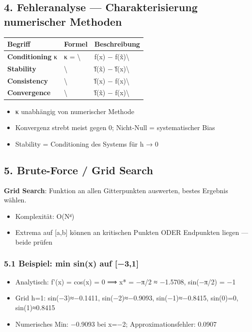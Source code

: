 \documentclass[11pt, a4paper]{article}
\begin{document}
\subsection{4. Fehleranalyse — Charakterisierung numerischer Methoden}


{\small
\begin{tabularx}{\linewidth}{XXX}
\hline
\rowcolor{tableheadbg}
{\color{white}\textbf{Begriff}} & {\color{white}\textbf{Formel}} & {\color{white}\textbf{Beschreibung}} \\[2pt]
\hline
\endhead
\hline
\endfoot
\textbf{Conditioning} κ & κ = \textbackslash{} & f(x) − f(x̃)\textbackslash{} \\
\textbf{Stability} & \textbackslash{} & f̃(x̃) − f̃(x)\textbackslash{} \\
\textbf{Consistency} & \textbackslash{} & f̃(x) − f(x)\textbackslash{} \\
\textbf{Convergence} & \textbackslash{} & f̃(x̃) − f(x)\textbackslash{} \\
\end{tabularx}
}


\begin{itemize}
  \item κ unabhängig von numerischer Methode
  \item Konvergenz strebt meist gegen 0; Nicht-Null = systematischer Bias
  \item Stability = Conditioning des Systems für h → 0
\end{itemize}


\subsection{5. Brute-Force / Grid Search}

\textbf{Grid Search}: Funktion an allen Gitterpunkten auswerten, bestes Ergebnis wählen.

\begin{itemize}
  \item Komplexität: O(Nᵈ)
  \item Extrema auf [a,b] können an kritischen Punkten ODER Endpunkten liegen — beide prüfen
\end{itemize}


\subsubsection{5.1 Beispiel: min sin(x) auf [−3,1]}
\begin{itemize}
  \item Analytisch: f'(x) = cos(x) = 0 ⟹ x* = −π/2 ≈ −1.5708, sin(−π/2) = −1
  \item Grid h=1: sin(−3)≈−0.1411, sin(−2)≈−0.9093, sin(−1)≈−0.8415, sin(0)=0, sin(1)≈0.8415
  \item Numerisches Min: −0.9093 bei x=−2; Approximationsfehler: 0.0907
\end{itemize}
\end{document}
